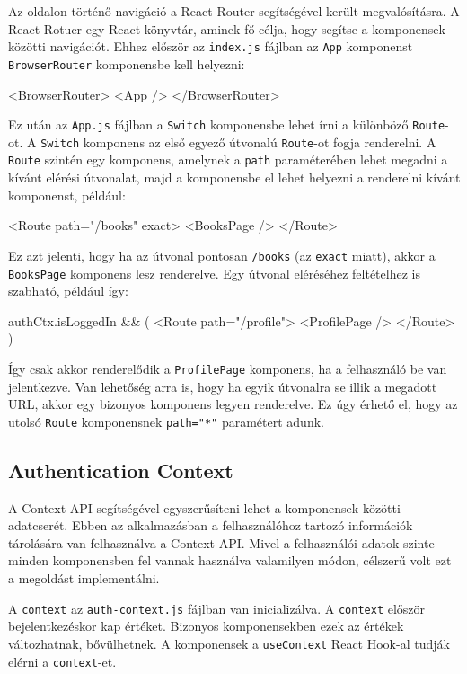 Az oldalon történő navigáció a React Router segítségével került megvalósításra. A React Rotuer egy React könyvtár, aminek fő célja, hogy segítse a komponensek közötti navigációt. Ehhez először az \texttt{index.js} fájlban az \texttt{App} komponenst \texttt{BrowserRouter} komponensbe kell helyezni:  
\begin{java}
<BrowserRouter>
  <App />
</BrowserRouter>     
\end{java}
Ez után az \texttt{App.js} fájlban a \texttt{Switch} komponensbe lehet írni a különböző \texttt{Route}-ot. A \texttt{Switch} komponens az első egyező útvonalú \texttt{Route}-ot fogja renderelni. A \texttt{Route} szintén egy komponens, amelynek a \texttt{path} paraméterében lehet megadni a kívánt elérési útvonalat, majd a komponensbe el lehet helyezni a renderelni kívánt komponenst, például: 
\begin{java}
<Route path="/books" exact>
  <BooksPage />
</Route>    
\end{java}
Ez azt jelenti, hogy ha az útvonal pontosan \texttt{/books} (az \texttt{exact} miatt), akkor a \\ \texttt{BooksPage} komponens lesz renderelve. Egy útvonal eléréséhez feltételhez is szabható, például így:
\begin{java}
{authCtx.isLoggedIn && (
  <Route path="/profile">
    <ProfilePage />
  </Route>
)}
\end{java}
Így csak akkor renderelődik a \texttt{ProfilePage} komponens, ha a felhasználó be van jelentkezve. Van lehetőség arra is, hogy ha egyik útvonalra se illik a megadott URL, akkor egy bizonyos komponens legyen renderelve. Ez úgy érhető el, hogy az utolsó \texttt{Route} komponensnek \texttt{path="*"} paramétert adunk.

\subsection{Authentication Context}

A Context API segítségével egyszerűsíteni lehet a komponensek közötti adatcserét. Ebben az alkalmazásban a felhasználóhoz tartozó információk tárolására van felhasználva a Context API. Mivel a felhasználói adatok szinte minden komponensben fel vannak használva valamilyen módon, célszerű volt ezt a megoldást implementálni. 

A \texttt{context} az \texttt{auth-context.js} fájlban van inicializálva. A \texttt{context} először bejelentkezéskor kap értéket. Bizonyos komponensekben ezek az értékek változhatnak, bővülhetnek. A komponensek a \texttt{useContext} React Hook-al tudják elérni a \texttt{context}-et.

